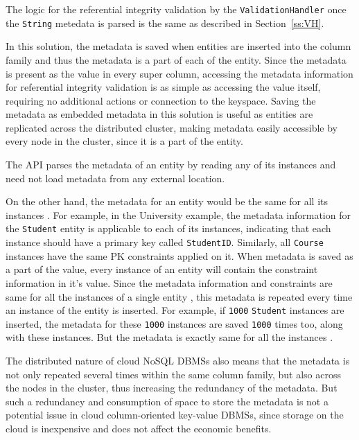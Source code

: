 	The logic for the referential integrity validation by the
	\texttt{ValidationHandler} once the \texttt{String} metedata is parsed is the
	same as described in Section~\ref{ss:VH}.

	In this solution, the metadata is saved  when entities are inserted into the
	column family and thus the metadata is a part of each of the entity.  Since the
	metadata is present as the value in every super column,  accessing the metadata
	information for referential integrity validation is as simple as accessing the
	value itself,  requiring no additional actions or connection to the
	keyspace. Saving the metadata as embedded metadata in this solution is useful
	as entities are replicated across the distributed cluster, making metadata
	easily accessible by every node in the cluster, since it is a part of the
	entity.
	
	The \ac{API} parses the metadata of an entity by reading any of its 
	instances and need not load metadata from any external location.

	On the other hand,  the metadata for an entity would be the same for all its
	instances .  For example,  in the University example,  the metadata
	information for the \texttt{Student} entity is applicable to each of its
	instances,  indicating that each instance  should have a primary key called
	\texttt{StudentID}.
	Similarly,  all \texttt{Course} instances have the same \ac{PK} constraints
	applied on it.  When metadata is saved as a part of the  value,
	every instance of an entity will contain the constraint information
	in it's value.  Since the metadata information and constraints are same for all
	the instances of a single entity ,  this metadata is repeated every time an
	instance of the entity is inserted.  For example,  if
	\texttt{1000} \texttt{Student} instances are inserted,  the metadata for these
	\texttt{1000} instances are saved \texttt{1000} times too, along with these
	instances.  But the metadata is exactly same for all the
	instances .


	The distributed nature of cloud \ac{NoSQL} \acp{DBMS} also means that the
	metadata is not only repeated several times within the same column family,  but
	also across the nodes in the cluster, thus increasing the redundancy of
	the metadata.  But such a redundancy and consumption
	of space to store the metadata is not a potential issue
	in cloud column-oriented key-value \acp{DBMS}, since storage on the cloud is
	inexpensive and  does not affect the economic benefits.

